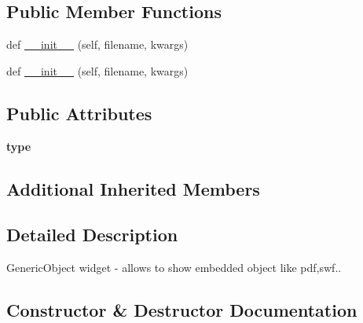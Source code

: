 \subsection*{Public Member Functions}
\begin{DoxyCompactItemize}
\item 
def \hyperlink{classremi_1_1gui_1_1GenericObject_a919ab6921c11385ab2537d732f812e19}{\+\_\+\+\_\+init\+\_\+\+\_\+} (self, filename, kwargs)
\item 
def \hyperlink{classremi_1_1gui_1_1GenericObject_a919ab6921c11385ab2537d732f812e19}{\+\_\+\+\_\+init\+\_\+\+\_\+} (self, filename, kwargs)
\end{DoxyCompactItemize}
\subsection*{Public Attributes}
\begin{DoxyCompactItemize}
\item 
{\bfseries type}\hypertarget{classremi_1_1gui_1_1GenericObject_a1096e15c6de14ca2c7fb5036849f1772}{}\label{classremi_1_1gui_1_1GenericObject_a1096e15c6de14ca2c7fb5036849f1772}

\end{DoxyCompactItemize}
\subsection*{Additional Inherited Members}


\subsection{Detailed Description}
\begin{DoxyVerb}GenericObject widget - allows to show embedded object like pdf,swf..
\end{DoxyVerb}
 

\subsection{Constructor \& Destructor Documentation}

